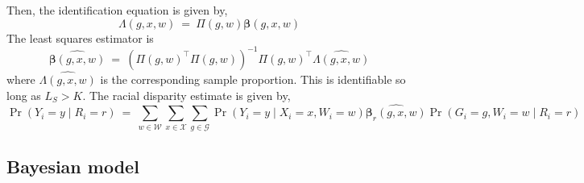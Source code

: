 \documentclass[11pt]{article}
\theoremstyle{plain}
\newcommand{\cW}{\mathcal{W}}
\newcommand{\cG}{\mathcal{G}}
\newcommand{\cX}{\mathcal{X}}
\newcommand{\bbeta}{\bm{\beta}}
\begin{document}
Then, the identification equation is given by,
\begin{equation}
  \Lambda(g,x,w) \ = \ \Pi(g,w) \bbeta(g,x,w)
\end{equation}
The least squares estimator is
\begin{equation}
  \widehat{\bbeta(g,x,w)} \ = \ \left(\Pi(g,w)^\top\Pi(g,w)\right)^{-1} \Pi(g,w)^\top \widehat{\Lambda(g,x,w)}
\end{equation}
where $\widehat{\Lambda(g,x,w)}$ is the corresponding sample
proportion. This is identifiable so long as $L_S > K$.  The racial
disparity estimate is given by,
\begin{equation}
  \Pr(Y_i = y \mid R_i = r) \ = \ \sum_{w \in \cW} \sum_{x \in \cX}
  \sum_{g \in \cG} \Pr(Y_i = y \mid X_i = x, W_i = w)
  \widehat{\bbeta_r(g,x,w)} \Pr(G_i = g, W_i = w \mid R_i = r)
\end{equation}

\subsection{Bayesian model}
\end{document}
